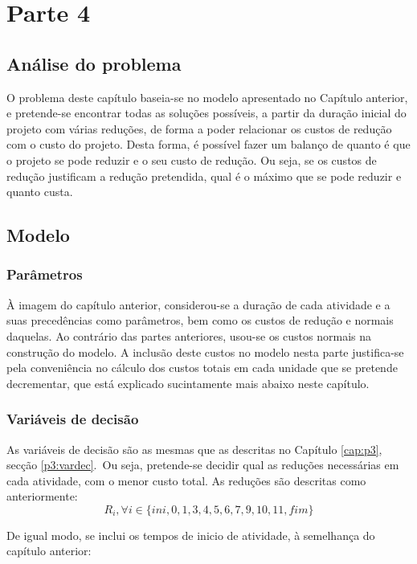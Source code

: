 \chapter{Parte 4}
\label{cap:p4}

\section{Análise do problema}

O problema deste capítulo baseia-se no modelo apresentado no Capítulo anterior,
e pretende-se encontrar todas as soluções possíveis, a partir da duração inicial
do projeto com várias reduções, de forma a poder relacionar os custos de redução
com o custo do projeto. Desta forma, é possível fazer um balanço de quanto é que
o projeto se pode reduzir e o seu custo de redução. Ou seja, se os custos de
redução justificam a redução pretendida, qual é o máximo que se pode reduzir
e quanto custa.

\section{Modelo}

\subsection{Parâmetros}

À imagem do capítulo anterior, considerou-se a duração de cada atividade
e a suas precedências como parâmetros, bem como os custos de redução e normais
daquelas. Ao contrário das partes anteriores, usou-se os custos normais na construção do modelo. A inclusão deste custos no modelo nesta parte justifica-se pela conveniência no
cálculo dos custos totais em cada unidade que se pretende decrementar, que está
explicado sucintamente mais abaixo neste capítulo.

\subsection{Variáveis de decisão}

As variáveis de decisão são as mesmas que as descritas no Capítulo \ref{cap:p3}, secção
 \ref{p3:vardec}.\ Ou seja, pretende-se decidir qual as reduções necessárias em cada
atividade, com o menor custo total. As reduções são descritas como
anteriormente: 
$$R_i, \forall i \in \{ini, 0, 1, 3, 4,5,6,7,9,10,11,fim\}$$

De igual modo, se inclui os tempos de inicio de atividade, à semelhança do
capítulo anterior:

